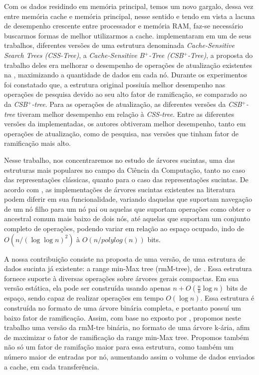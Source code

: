 Com os dados residindo em memória principal, temos um novo gargalo, dessa vez entre memória cache e memória principal,  nesse sentido e tendo em vista a lacuna de desempenho crescente entre processador e memória RAM, faz-se necessário buscarmos formas de melhor utilizarmos a cache.  \citet{paper-making-btree-cache} implementaram em um de seus trabalhos, diferentes versões de uma estrutura denominada \textit{Cache-Sensitive Search Trees (CSS-Tree)}, a \textit{Cache-Sensitive B$^+$-Tree (CSB$^+$-Tree)}, a proposta do trabalho deles era melhorar o desempenho de operações de atualização existentes na , maximizando a quantidade de dados em cada nó. Durante os experimentos foi constatado que, a estrutura original possiuía melhor desempenho nas operações de pesquisa devido ao seu alto fator de ramificação, se comparado ao da \textit{CSB$^+$-tree}. Para as operações de atualização, as diferentes versões da \textit{CSB$^+$-tree} tiveram melhor desempenho em relação à \textit{CSS-tree}. Entre as diferentes versões da  implementadas, os autores obtiveram melhor desempenho, tanto em operações de atualização, como de pesquisa, nas versões que tinham fator de ramificação mais alto.

Nesse trabalho, nos concentraremos no estudo de árvores sucintas, uma das estruturas mais populares no campo da Ciência da Computação, tanto no caso das representações clássicas, quanto para o caso das representações sucintas. De acordo com \citet{paper-succint-trees-in-practice}, as implementações de árvores sucintas existentes na literatura podem diferir em sua funcionalidade, variando daquelas que suportam navegação de um nó filho para um nó pai ou aquelas que suportam operações como obter o ancestral comum mais baixo de dois nós, até aquelas que suportam um conjunto completo de operações, podendo variar em relação ao espaço ocupado, indo  de $O(n/(\log \log n)^2)$ à $O(n/ polylog(n))$ bits.

A nossa contribuição consiste na proposta de uma versão, de uma estrutura de dados sucinta já existente: a range min-Max tree (rmM-tree), de \cite{paper-fully-functinal-succint-trees}. Essa estrutura fornece suporte à diversas operações sobre árvores gerais compactas. Em sua versão estática, ela pode ser construída usando apenas $n + O(\frac{n}{b} \log n)$ bits de espaço, sendo capaz de realizar operações em tempo $O(\log n)$\citep{paper-fully-functinal-succint-trees}. Essa estrutura é construída no formato de uma árvore binária completa, e portanto possuí um baixo fator de ramificação. Assim, com base no exposto por \citet{paper-making-btree-cache}, propomos neste trabalho uma versão da rmM-tre binária, no formato de uma árvore k-ária, afim de maximizar o fator de ramificação da range min-Max tree. Propomos também não só um fator de ramifação maior para essa estrutura, como também um número maior de entradas por nó, aumentando assim o volume de dados enviados a cache, em cada transferência.


